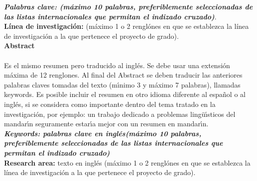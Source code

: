 \textbf{\small \textit{Palabras clave: (m\'{a}ximo 10 palabras, preferiblemente seleccionadas de las listas internacionales que permitan el indizado cruzado)}}.\\

\textbf{\small L\'inea de investigaci\'on:} \small (m\'aximo 1 o 2  rengl\'ones en que se establezca la  l\'inea de investigaci\'on a la que pertenece el proyecto de grado).\\


\newpage
\textbf{\LARGE Abstract}\\\\
Es el mismo resumen pero traducido al ingl\'{e}s. Se debe usar una extensi\'{o}n m\'{a}xima de 12 renglones. Al final del Abstract se deben traducir las anteriores palabras claves tomadas del texto (m\'{\i}nimo 3 y m\'{a}ximo 7 palabras), llamadas keywords. Es posible incluir el resumen en otro idioma diferente al espa\~{n}ol o al ingl\'{e}s, si se considera como importante dentro del tema tratado en la investigaci\'{o}n, por ejemplo: un trabajo dedicado a problemas ling\"{u}\'{\i}sticos del mandar\'{\i}n seguramente estar\'{\i}a mejor con un resumen en mandar\'{\i}n.\\[2.0cm]
\textbf{\small \textit {Keywords: palabras clave en ingl\'es(m\'aximo 10 palabras, preferiblemente seleccionadas de las listas internacionales que permitan el indizado cruzado)}}\\

\textbf{\small Research area:} \small texto en ingl\'es (m\'aximo 1 o 2  rengl\'ones en que se establezca la  l\'inea de investigaci\'on a la que pertenece el proyecto de grado).\\